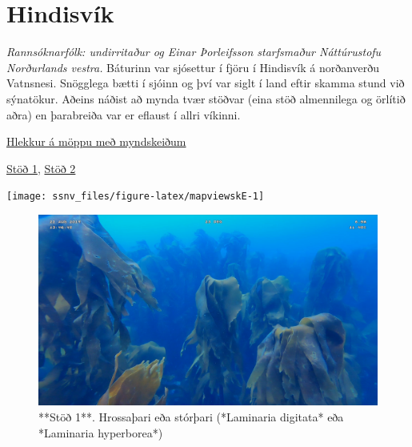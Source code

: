 \documentclass[icelandic,]{book}
\begin{document}
\hypertarget{hindisvik}{%
\chapter*{Hindisvík}\label{hindisvik}}

\emph{Rannsóknarfólk: undirritaður og Einar Þorleifsson starfsmaður Náttúrustofu Norðurlands vestra.}
Báturinn var sjósettur í fjöru í Hindisvík á norðanverðu Vatnsnesi. Snögglega bætti í sjóinn og því var siglt í land eftir skamma stund við sýnatökur. Aðeins náðist að mynda tvær stöðvar (eina stöð almennilega og örlítið aðra) en þarabreiða var er eflaust í allri víkinni.

\href{https://www.dropbox.com/sh/t3wzev18jphbmjo/AADBKgpTNiw3lhvZZJeEHMNva?dl=0}{Hlekkur á möppu með myndskeiðum}

\href{https://www.dropbox.com/s/ficlrkk5m1c1yf5/Trident-Aug-21-140709-HQ.mp4?dl=0}{Stöð 1},
\href{https://www.dropbox.com/s/lmrkuw6daol7bco/Trident-Aug-21-134347-HQ.mp4?dl=0}{Stöð 2}

\begin{center}\texttt{[image: ssnv\_files/figure-latex/mapviewskE-1]} \end{center}

\begin{figure}

{\centering \includegraphics[width=1\linewidth]{skjol/skogar/sk5/stodvar/st1/sk5-st1} 

}

\caption{**Stöð 1**. Hrossaþari eða stórþari (*Laminaria digitata* eða *Laminaria hyperborea*)}\label{fig:mynd-sk-fimm-stod-eitt}
\end{figure}
\end{document}
